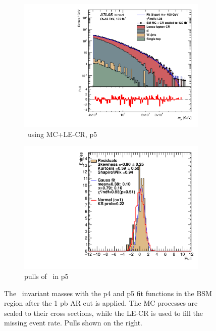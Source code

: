 \begin{figure}[ht]
\begin{subfigure}[h]{0.38\linewidth}
    \includegraphics[scale=0.3]{figs/ch6/fit/variable_nosmooth/p5/1PB/output_SMMCplusCR_Mje_p5.pdf}%
     \caption{\mje \ using MC+LE-CR, p5}
     \end{subfigure}
     \hfill
    \begin{subfigure}[h]{0.4\linewidth}
    \includegraphics[scale=0.32]{figs/ch6/fit/variable_nosmooth/p5/1PB/pull_SMMCplusCR_Mje_p5.pdf}%
    \caption{pulls of \mje \ in p5}
    \end{subfigure}
    \caption{The \mje \ invariant masses with the p4 and p5 fit functions in the BSM region after the 1 pb AR cut is applied. The MC processes are scaled to their cross sections, while the LE-CR is used to fill the missing event rate. Pulls shown on the right.}
\label{fig:mje-fit-pulls-1pb}
\end{figure}

